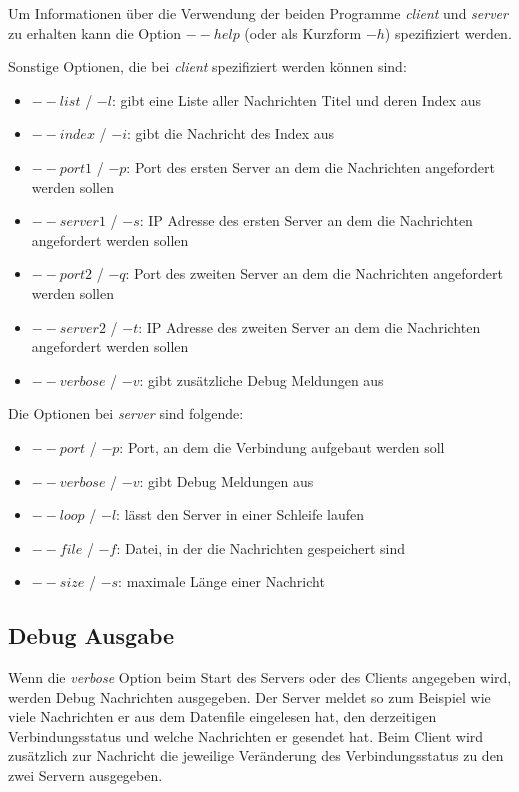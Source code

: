 \documentclass[]{article}
\begin{document}
Um Informationen über die Verwendung der beiden Programme \textit{client} und \textit{server} zu erhalten kann die Option $--help$ (oder als Kurzform $-h$) spezifiziert werden.

Sonstige Optionen, die bei \textit{client} spezifiziert werden können sind:

\begin{itemize}
	\item $--list$ / $-l$: gibt eine Liste aller Nachrichten Titel und deren Index aus
	\item $--index$ / $-i$: gibt die Nachricht des Index aus
	\item $--port1$ / $-p$: Port des ersten Server an dem die Nachrichten angefordert werden sollen
	\item $--server1$ / $-s$: IP Adresse des ersten Server an dem die Nachrichten angefordert werden sollen
	\item $--port2$ / $-q$: Port des zweiten Server an dem die Nachrichten angefordert werden sollen
	\item $--server2$ / $-t$: IP Adresse des zweiten Server an dem die Nachrichten angefordert werden sollen
	\item $--verbose$ / $-v$: gibt zusätzliche Debug Meldungen aus
\end{itemize}

\noindent
Die Optionen bei \textit{server} sind folgende:

\begin{itemize}
	\item $--port$ / $-p$: Port, an dem die Verbindung aufgebaut werden soll
	\item $--verbose$ / $-v$: gibt Debug Meldungen aus
	\item $--loop$ / $-l$: lässt den Server in einer Schleife laufen
	\item $--file$ / $-f$: Datei, in der die Nachrichten gespeichert sind
	\item $--size$ / $-s$: maximale Länge einer Nachricht
\end{itemize}

\subsection{Debug Ausgabe}
Wenn die \textit{verbose} Option beim Start des Servers oder des Clients angegeben wird, werden Debug Nachrichten ausgegeben. Der Server meldet so zum Beispiel wie viele Nachrichten er aus dem Datenfile eingelesen hat, den derzeitigen Verbindungsstatus und welche Nachrichten er gesendet hat. Beim Client wird zusätzlich zur Nachricht die jeweilige Veränderung des Verbindungsstatus zu den zwei Servern ausgegeben.
\end{document}
